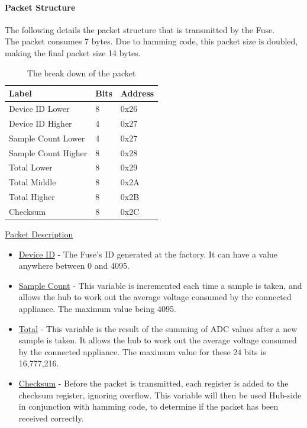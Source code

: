 \documentclass[preprint,12pt,3p]{elsarticle}
\begin{document}
\paragraph{Packet Structure}
The following details the packet structure that is transmitted by the Fuse.\\
The packet consumes 7 bytes. Due to hamming code, this packet size is doubled, making the final packet size 14 bytes.\\[5pt]
\begin{table}[H]
\centering
\resizebox{8cm}{!} {%
    \centering
    \begin{tabular}{| l | l | p{2cm} |}
    \hline
    Label & Bits &  Address \\ \hline
    Device ID Lower & 8 & 0x26\\ \hline
    Device ID Higher & 4 & 0x27\\ \hline
    Sample Count Lower & 4 & 0x27\\ \hline
    Sample Count Higher & 8 & 0x28\\ \hline
    Total Lower & 8 & 0x29\\ \hline
    Total Middle & 8 & 0x2A\\ \hline
    Total Higher & 8 & 0x2B\\ \hline
    Checksum & 8 & 0x2C\\ \hline
    \end{tabular}
}
\caption{The break down of the packet}
\label{tab:packet}
\end{table}
\underline{Packet Description}
\begin{itemize}
\item \underline{Device ID} - The Fuse's ID generated at the factory. It can have a value anywhere between 0 and 4095.
\item \underline{Sample Count} - This variable is incremented each time a sample is taken, and allows the hub to work out the average voltage consumed by the connected appliance. The maximum value being 4095.
\item \underline{Total} - This variable is the result of the summing of ADC values after a new sample is taken. It allows the hub to work out the average voltage consumed by the connected appliance. The maximum value for these 24 bits is 16,777,216.
\item \underline{Checksum} - Before the packet is transmitted, each register is added to the checksum register, ignoring overflow. This variable will then be used Hub-side in conjunction with hamming code, to determine if the packet has been received correctly.
\end{itemize}
\end{document}
